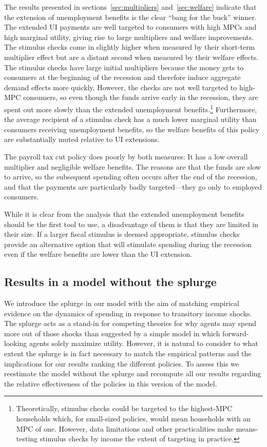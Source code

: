 \documentclass[../HAFiscal]{subfiles}
\begin{document}
The results presented in sections~\ref{sec:multipliers} and~\ref{sec:welfare} indicate that the extension of unemployment benefits is the clear ``bang for the buck'' winner.
The extended UI payments are well targeted to consumers with high MPCs and high marginal utility, giving rise to large multipliers and welfare improvements.
The stimulus checks come in slightly higher when measured by their short-term multiplier effect but are a distant second when measured by their welfare effects.
The stimulus checks have large initial multipliers because the money gets to consumers at the beginning of the recession and therefore induce aggregate demand effects more quickly.
However, the checks are not well targeted to high-MPC consumers, so even though the funds arrive early in the recession, they are spent out more slowly than the extended unemployment benefits.\footnote{Theoretically, stimulus checks could be targeted to the highest-MPC households which, for small-sized policies, would mean households with an MPC of one.
  However, data limitations and other practicalities make means-testing stimulus checks by income the extent of targeting in practice.} Furthermore, the average recipient of a stimulus check has a much lower marginal utility than consumers receiving unemployment benefits, so the welfare benefits of this policy are substantially muted relative to UI extensions.

The payroll tax cut policy does poorly by both measures: It has a low overall multiplier and negligible welfare benefits.
The reasons are that the funds are slow to arrive, so the subsequent spending often occurs after the end of the recession, and that the payments are particularly badly targeted---they go only to employed consumers.

While it is clear from the analysis that the extended unemployment benefits should be the first tool to use, a disadvantage of them is that they are limited in their size.
If a larger fiscal stimulus is deemed appropriate, stimulus checks provide an alternative option that will stimulate spending during the recession even if the welfare benefits are lower than the UI extension.

\FloatBarrier
\subsection{Results in a model without the splurge}
\whenintegrated{\label{subsec:Model-without-splurge}}

We introduce the splurge in our model with the aim of matching empirical evidence on the dynamics of spending in response to transitory income shocks.
The splurge acts as a stand-in for competing theories for why agents may spend more out of those shocks than suggested by a simple model in which forward-looking agents solely maximize utility.
However, it is natural to consider to what extent the splurge is in fact necessary to match the empirical patterns and the implications for our results ranking the different policies.
To assess this we  reestimate the model without the splurge and recompute all our results regarding the relative effectiveness of the policies in this version of the model.
\end{document}
